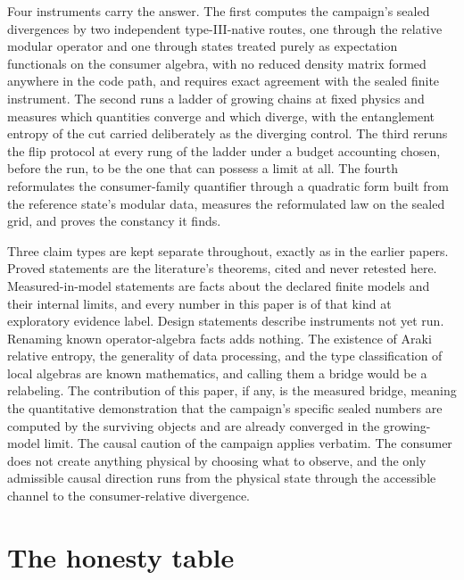 \documentclass[aps,prd,reprint,nofootinbib,longbibliography]{revtex4-2}
\begin{document}
Four instruments carry the answer.  The first computes the campaign's
sealed divergences by two independent type-III-native routes, one through
the relative modular operator and one through states treated purely as
expectation functionals on the consumer algebra, with no reduced density
matrix formed anywhere in the code path, and requires exact agreement
with the sealed finite instrument.  The second runs a ladder of growing
chains at fixed physics and measures which quantities converge and which
diverge, with the entanglement entropy of the cut carried deliberately as
the diverging control.  The third reruns the flip protocol at every rung
of the ladder under a budget accounting chosen, before the run, to be the
one that can possess a limit at all.  The fourth reformulates the
consumer-family quantifier through a quadratic form built from the
reference state's modular data, measures the reformulated law on the
sealed grid, and proves the constancy it finds.

Three claim types are kept separate throughout, exactly as in the earlier
papers.  Proved statements are the literature's theorems, cited and never
retested here.  Measured-in-model statements are facts about the declared
finite models and their internal limits, and every number in this paper
is of that kind at exploratory evidence label.  Design statements
describe instruments not yet run.  Renaming known
operator-algebra facts adds nothing.  The existence of Araki relative
entropy, the generality of data processing, and the type classification
of local algebras are known mathematics, and calling them a bridge would
be a relabeling.  The contribution of this paper, if any, is the measured
bridge, meaning the quantitative demonstration that the campaign's
specific sealed numbers are computed by the surviving objects and are
already converged in the growing-model limit.  The causal caution of the
campaign applies verbatim.  The consumer does not create anything
physical by choosing what to observe, and the only admissible causal
direction runs from the physical state through the accessible channel to
the consumer-relative divergence.

\section{The honesty table}
\label{sec:honesty}
\end{document}
